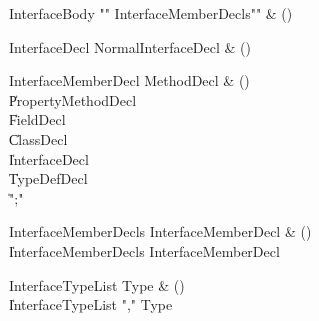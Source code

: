 \begin{bbgrammar}

InterfaceBody \label{prod:InterfaceBody}  \: \xcd"{" InterfaceMemberDecls\opt \xcd"}" & () \\


\end{bbgrammar}

\begin{bbgrammar}

InterfaceDecl \label{prod:InterfaceDecl}  \: NormalInterfaceDecl & () \\


\end{bbgrammar}

\begin{bbgrammar}

InterfaceMemberDecl \label{prod:InterfaceMemberDecl}  \: MethodDecl & () \\

    \| PropertyMethodDecl \\
    \| FieldDecl \\
    \| ClassDecl \\
    \| InterfaceDecl \\
    \| TypeDefDecl \\
    \| \xcd";" \\

\end{bbgrammar}

\begin{bbgrammar}

InterfaceMemberDecls \label{prod:InterfaceMemberDecls}  \: InterfaceMemberDecl & () \\

    \| InterfaceMemberDecls InterfaceMemberDecl \\

\end{bbgrammar}

\begin{bbgrammar}

InterfaceTypeList \label{prod:InterfaceTypeList}  \: Type & () \\

    \| InterfaceTypeList \xcd"," Type \\

\end{bbgrammar}

